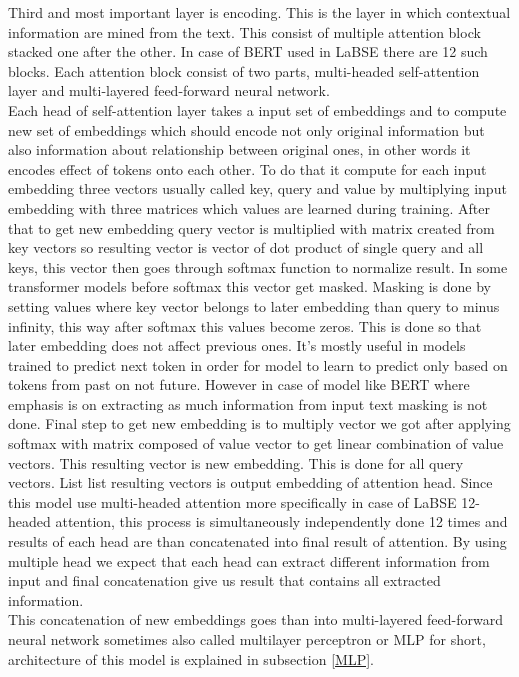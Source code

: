 Third and most important layer is encoding. This is the layer in which contextual information are mined from the text. This consist of multiple attention block stacked one after the other. In case of BERT used in LaBSE there are 12 such blocks. Each attention block consist of two parts, multi-headed self-attention layer and multi-layered feed-forward neural network. 
\\

Each head of self-attention layer takes a input set of embeddings and to compute new set of embeddings which should encode not only original information but also information about relationship between original ones, in other words it encodes effect of tokens onto each other. To do that it compute for each input embedding three vectors usually called key, query and value by multiplying input embedding with three matrices which values are learned during training. After that to get new embedding query vector is multiplied with matrix created from key vectors so resulting vector is vector of dot product of single query and all keys, this vector then goes through softmax function to normalize result. In some transformer models before softmax this vector get masked. Masking is done by setting values where key vector belongs to later embedding than query to minus infinity, this way after softmax this values become zeros. This is done so that later embedding does not affect previous ones. It's mostly useful in models trained to predict next token in order for model to learn to predict only based on tokens from past on not future. However in case of model like BERT where emphasis is on extracting as much information from input text masking is not done. Final step to get new embedding is to multiply vector we got after applying softmax with matrix composed of value vector to get linear combination of value vectors. This resulting vector is new embedding. This is done for all query vectors. List list resulting vectors is output embedding of attention head. Since this model use multi-headed attention more specifically in case of LaBSE 12-headed attention, this process is simultaneously independently done 12 times and results of each head are than concatenated into final result of attention. By using multiple head we expect that each head can extract different information from input and final concatenation give us result that contains all extracted information.    
\\

This concatenation of new embeddings goes than into multi-layered feed-forward neural network sometimes also called multilayer perceptron or MLP for short, architecture of this model is explained in subsection \ref{MLP}.
\\

